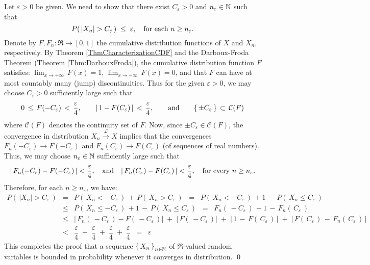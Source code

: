 \proof
Let $\varepsilon > 0$ be given.
We need to show that there exist $C_{\varepsilon} > 0$ and $n_{\varepsilon} \in \mathbb{N}$ such that
\begin{equation*}
P\!\left(\,|X_{n}| > C_{\varepsilon} \,\right) \; \leq \; \varepsilon,
\quad
\textnormal{for each $n \geq n_{\varepsilon}$}.
\end{equation*}
Denote by $F, F_{n} : \Re \longrightarrow [0,1]$ the cumulative distribution functions of $X$ and $X_{n}$, respectively.
By Theorem \ref{ThmCharacterizationCDF} and
the Darboux-Froda Theorem (Theorem \ref{Thm:DarbouxFroda}),
the cumulative distribution function $F$ satisfies:
$\lim_{x\rightarrow+\infty}\,F(x) = 1$, $\lim_{x\rightarrow-\infty}\,F(x) = 0$, and that
$F$ can have at most countably many (jump) discontinuities.
Thus for the given $\varepsilon > 0$, we may choose $C_{\varepsilon} > 0$ sufficiently large such that
\begin{equation*}
0 \,\leq\, F(-C_{\varepsilon}) \,<\, \dfrac{\varepsilon}{4},
\quad\quad
\vert\,1 - F(C_{\varepsilon})\,\vert \, < \, \dfrac{\varepsilon}{4},
\quad\quad\textnormal{and}\quad\quad
\{\,\pm C_{\varepsilon}\,\} \,\subset\, \mathcal{C}(F)
\end{equation*}
where $\mathcal{C}(F)$ denotes the continuity set of $F$.
Now, since $\pm C_{\varepsilon} \in \mathcal{C}(F)$, the convergence in distribution
$X_{n} \overset{\mathcal{L}}{\longrightarrow} X$ implies that the convergences
$F_{n}(-C_{\varepsilon}) \longrightarrow F(-C_{\varepsilon})$ and
$F_{n}(C_{\varepsilon}) \longrightarrow F(C_{\varepsilon})$ (of sequences of real numbers).
Thus, we may choose $n_{\varepsilon} \in \mathbb{N}$ sufficiently large such that
\begin{equation*}
\vert\,F_{n}(-C_{\varepsilon}) - F(-C_{\varepsilon})\,\vert < \dfrac{\varepsilon}{4},
\quad\textnormal{and}\quad
\vert\,F_{n}(C_{\varepsilon}) - F(C_{\varepsilon})\,\vert < \dfrac{\varepsilon}{4},
\quad\textnormal{for every $n \geq n_{\varepsilon}$}.
\end{equation*}
Therefore, for each $n \geq n_{\varepsilon}$, we have:
\begin{eqnarray*}
P\!\left(\,|X_{n}| > C_{\varepsilon} \,\right)
&=& P\!\left(\,X_{n} < - C_{\varepsilon} \,\right) \, + \, P\!\left(\, X_{n} > C_{\varepsilon} \,\right)
\;\;=\;\; P\!\left(\,X_{n} < - C_{\varepsilon} \,\right) \, + 1 \, - \, P\!\left(\, X_{n} \leq C_{\varepsilon} \,\right)
\\
&\leq& P\!\left(\,X_{n} \leq - C_{\varepsilon} \,\right) \, + 1 \, - \, P\!\left(\, X_{n} \leq C_{\varepsilon} \,\right)
\;\;=\;\; F_{n}\!\left(\, - C_{\varepsilon} \,\right) \, + 1 \, - \, F_{n}\!\left(\, C_{\varepsilon} \,\right)
\\
&\leq& \vert\,F_{n}\!\left(\, - C_{\varepsilon} \,\right) - F\!\left(\,-C_{\varepsilon}\,\right)\vert \; + \; \vert\,F\!\left(\,-C_{\varepsilon}\,\right)\vert \; + \;
\vert\, 1 \, - \, F\!\left(\, C_{\varepsilon} \,\right)\,\vert \;+\; \vert\, F\!\left(\, C_{\varepsilon} \,\right) \, - \, F_{n}\!\left(\, C_{\varepsilon} \,\right)\,\vert
\\
&<& \dfrac{\varepsilon}{4} \; + \; \dfrac{\varepsilon}{4} \; + \; \dfrac{\varepsilon}{4} \; + \; \dfrac{\varepsilon}{4} \;\; = \;\; \varepsilon
\end{eqnarray*}
This completes the proof that a sequence $\left\{\,X_{n}\,\right\}_{n\in\mathbb{N}}$ of $\Re$-valued random variables
is bounded in probability whenever it converges in distribution.
\qed

